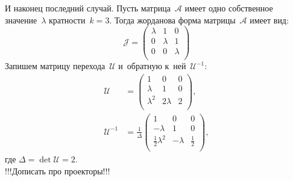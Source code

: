 И наконец последний случай.		
Пусть матрица~$\mathcal{A}$ имеет одно собственное значение~$\lambda$ 
кратности~$k=3$. Тогда жорданова форма матрицы~$\mathcal{A}$ имеет вид:
$$
 \mathcal{J} = 
 \begin{pmatrix}
  \lambda & 1 & 0\\
  0 & \lambda & 1 \\
  0 & 0 & \lambda \\
 \end{pmatrix}
$$
Запишем матрицу перехода~$\mathcal{U}$ и~обратную к~ней~$\mathcal{U}^{-1}$:
$$
\begin{aligned}
 \mathcal{U} &= 
 \begin{pmatrix}
  	1 & 0 & 0\\
  	\lambda & 1 & 0 \\
  	\lambda^2 & 2\lambda & 2 \\
 \end{pmatrix}, \\
 \mathcal{U}^{-1} &= \frac{1}{\Delta} 
 \begin{pmatrix}
  	1 & 0 & 0  \\
  	-\lambda & 1 & 0  \\
  	\frac{1}{2}\lambda^2 & -\lambda & \frac{1}{2} \\
 \end{pmatrix},
\end{aligned}
$$
где $\Delta = \det \mathcal{U} = 2$. \\
!!!Дописать про проекторы!!!